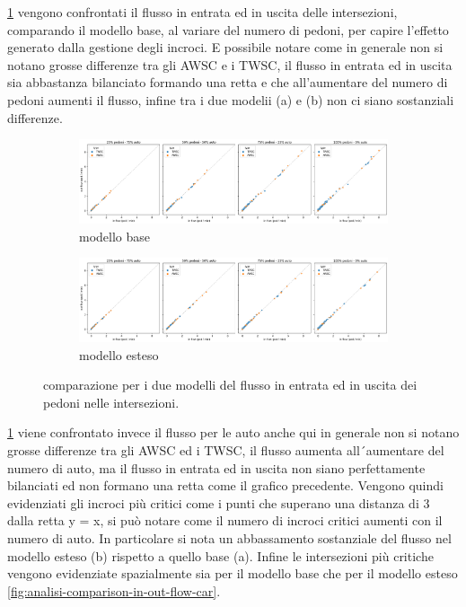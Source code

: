 \newpage


\ref*{fig:analisi-comparison-in-out-flow-ped} vengono confrontati il flusso in entrata ed in uscita delle intersezioni,
comparando il modello base, al variare del numero di pedoni, per capire l'effetto generato dalla gestione degli incroci.
E possibile notare come in generale non si notano grosse differenze tra gli AWSC e i TWSC, 
il flusso in entrata ed in uscita sia abbastanza bilanciato formando una retta e che all'aumentare
del numero di pedoni aumenti il flusso, infine tra i due modelii (a) e (b) non ci siano sostanziali differenze.

\begin{figure}[h]
    \centering
    \begin{subfigure}{0.99\textwidth}
        \centering
        \includegraphics[width=\textwidth]{images/analisi/comparison-base-in-out-flow-ped.png}
        \caption{modello base}
    \end{subfigure}
    \begin{subfigure}{0.99\textwidth}
        \centering
        \includegraphics[width=\textwidth]{images/analisi/comparison-new-in-out-flow-ped.png}
        \caption{modello esteso}
    \end{subfigure}
    \caption{comparazione per i due modelli del flusso in entrata ed in uscita dei pedoni nelle intersezioni.}
    \label{fig:analisi-comparison-in-out-flow-ped}
\end{figure}

\ref{fig:analisi-comparison-in-out-flow-ped} viene confrontato invece il flusso per le auto anche
qui in generale non si notano grosse differenze tra gli AWSC ed i TWSC, il flusso aumenta all´aumentare del numero di auto,
ma il flusso in entrata ed in uscita non siano perfettamente bilanciati ed non
formano una retta come il grafico precedente.
Vengono quindi evidenziati gli incroci più critici come i punti che superano una distanza di 3 dalla retta y = x,
si può notare come il numero di incroci critici aumenti con il numero di auto.
In particolare si nota un abbassamento sostanziale del flusso nel modello esteso (b)
rispetto a quello base (a).
Infine le intersezioni più critiche vengono evidenziate spazialmente sia per il modello base 
che per il modello esteso \ref{fig:analisi-comparison-in-out-flow-car}.

